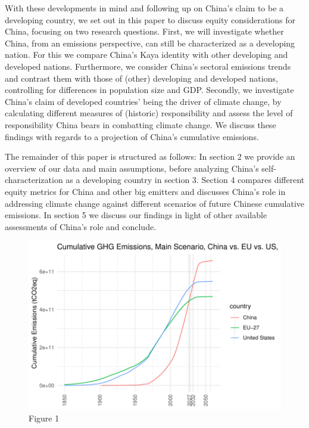\documentclass[
  12pt,
]{article}
\numberwithin{equation}{section}
\numberwithin{table}{section}
\numberwithin{figure}{section}
\begin{document}
With these developments in mind and following up on China's claim to be
a developing country, we set out in this paper to discuss equity
considerations for China, focusing on two research questions. First, we
will investigate whether China, from an emissions perspective, can still
be characterized as a developing nation. For this we compare China's
Kaya identity with other developing and developed nations. Furthermore,
we consider China's sectoral emissions trends and contrast them with
those of (other) developing and developed nations, controlling for
differences in population size and GDP. Secondly, we investigate China's
claim of developed countries' being the driver of climate change, by
calculating different measures of (historic) responsibility and assess
the level of responsibility China bears in combatting climate change. We
discuss these findings with regards to a projection of China's
cumulative emissions.

The remainder of this paper is structured as follows: In section 2 we
provide an overview of our data and main assumptions, before analyzing
China's self-characterization as a developing country in section 3.
Section 4 compares different equity metrics for China and other big
emitters and discusses China's role in addressing climate change against
different scenarios of future Chinese cumulative emissions. In section 5
we discuss our findings in light of other available assessments of
China's role and conclude.

\begin{figure}
\centering
\includegraphics{Paper_files/figure-latex/unnamed-chunk-1-1.pdf}
\caption{Figure 1}
\end{figure}
\end{document}
